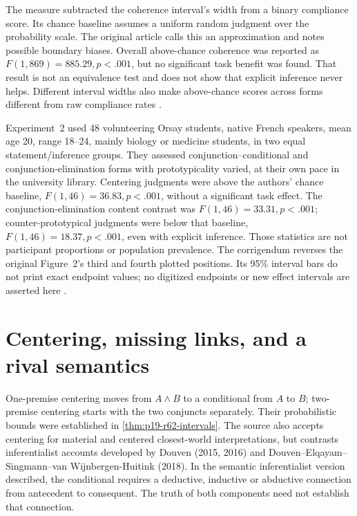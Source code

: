The measure subtracted the coherence interval's width from a binary
compliance score. Its chance baseline assumes a uniform random judgment
over the probability scale. The original article calls this an approximation
and notes possible boundary biases. Overall above-chance coherence was
reported as \(F(1,869)=885.29,p<.001\), but no significant task benefit
was found. That result is not an equivalence test and does not show that
explicit inference never helps. Different interval widths also make
above-chance scores across forms different from raw compliance rates
\cite[pp.~3--5,8]{CruzEtAl2015Coherence}.

Experiment~2 used 48 volunteering Orsay students, native French speakers,
mean age 20, range 18--24, mainly biology or medicine students, in two
equal statement/inference groups. They assessed conjunction--conditional
and conjunction-elimination forms with prototypicality varied, at their
own pace in the university library. Centering judgments were above the
authors' chance baseline, \(F(1,46)=36.83,p<.001\), without a
significant task effect. The conjunction-elimination content contrast was
\(F(1,46)=33.31,p<.001\); counter-prototypical judgments were below
that baseline, \(F(1,46)=18.37,p<.001\), even with explicit inference.
Those statistics are not participant proportions or population prevalence.
The corrigendum reverses the original Figure~2's third and fourth plotted
positions. Its 95\% interval bars do not print exact endpoint values;
no digitized endpoints or new effect intervals are asserted here
\cite[pp.~5--8]{CruzEtAl2015Coherence}
\cite{CruzEtAl2015CoherenceCorrigendum}.

\section{Centering, missing links, and a rival semantics}
\label{sec:p19-r62-centering}

One-premise centering moves from \(A\land B\) to a conditional from
\(A\) to \(B\); two-premise centering starts with the two conjuncts
separately. Their probabilistic bounds were established in
\cref{thm:p19-r62-intervals}. The source also accepts centering for
material and centered closest-world interpretations, but contrasts
inferentialist accounts developed by Douven (2015, 2016) and
Douven--Elqayam--Singmann--van Wijnbergen-Huitink (2018).
In the semantic inferentialist version described, the conditional requires
a deductive, inductive or abductive connection from antecedent to consequent.
The truth of both components need not establish that connection.

